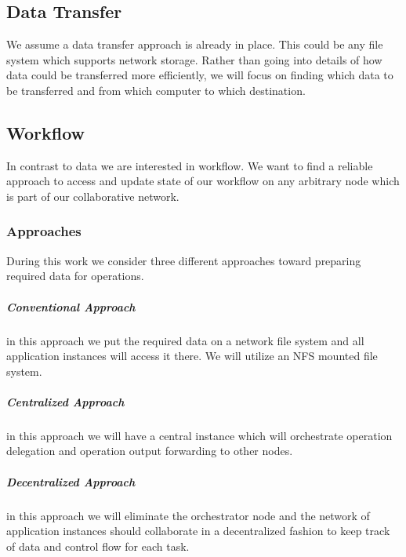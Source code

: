 \subsection{Data Transfer}
We assume a data transfer approach is already in place. This could be any file system which supports 
network storage. Rather than going into details of how data could be transferred more efficiently, we will
focus on finding which data to be transferred and from which computer to which destination.

\subsection{Workflow}
In contrast to data we are interested in workflow. We want to find a reliable approach to access and update 
state of our workflow on any arbitrary node which is part of our collaborative network.




\subsubsection{Approaches}
During this work we consider three different approaches toward preparing required data for operations.
\subparagraph{Conventional Approach} in this approach we put the required data on a network file system and all
application instances will access it there. We will utilize an NFS mounted file system.
\subparagraph{Centralized Approach} in this approach we will have a central instance which will orchestrate operation
delegation and operation output forwarding to other nodes.
\subparagraph{Decentralized Approach} in this approach we will eliminate the orchestrator node and the network of
application instances should collaborate in a decentralized fashion to keep track of data and control flow for each
task.

